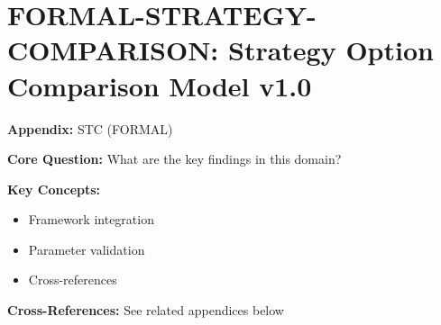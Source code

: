 
\chapter{FORMAL-STRATEGY-COMPARISON: Strategy Option Comparison Model v1.0}
\label{app:socm}


\begin{tcolorbox}[colback=blue!5!white, colframe=blue!75!black,
    title=Quick Reference: Appendix UNMAPPED_STC]

\textbf{Appendix:} STC (FORMAL)

\textbf{Core Question:} What are the key findings in this domain?

\textbf{Key Concepts:}
\begin{itemize}[nosep]
\item Framework integration
\item Parameter validation
\item Cross-references
\end{itemize}

\textbf{Cross-References:} See related appendices below
\end{tcolorbox}


\begin{abstract}
This appendix presents the Strategy Option Comparison Model v1.0 (SOCM), a theory-driven framework for evaluating and comparing strategic options within a company's portfolio. SOCM models strategic decision-making as a portfolio optimization problem where complementarity effects (γ parameters) between different strategic options directly impact organic growth. The model integrates six context factors ($\Psi$), six strategic evaluation dimensions (including explicit organic growth measurement), and ten complementarity parameters to predict which combinations of strategic options maximize organic growth. SOCM bridges strategic theory (Porter, Rumelt, BCG) with evidence-based decision-making, enabling companies to move beyond binary strategy choices toward dynamic portfolio combinations.
\end{abstract}


